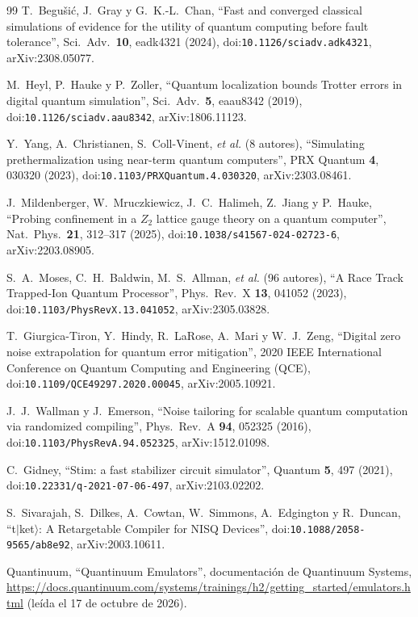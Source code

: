 \documentclass[11pt,a4paper]{article}
\begin{document}
\begin{thebibliography}{99}
 T.~Begu\v{s}i\'c, J.~Gray y G.~K.-L.~Chan, ``Fast and converged classical simulations of evidence for the utility of quantum computing before fault tolerance'', Sci.\ Adv.\ \textbf{10}, eadk4321 (2024), doi:\nolinkurl{10.1126/sciadv.adk4321}, arXiv:2308.05077.

 M.~Heyl, P.~Hauke y P.~Zoller, ``Quantum localization bounds Trotter errors in digital quantum simulation'', Sci.\ Adv.\ \textbf{5}, eaau8342 (2019), doi:\nolinkurl{10.1126/sciadv.aau8342}, arXiv:1806.11123.

 Y.~Yang, A.~Christianen, S.~Coll-Vinent, \emph{et al.} (8 autores), ``Simulating prethermalization using near-term quantum computers'', PRX Quantum \textbf{4}, 030320 (2023), doi:\nolinkurl{10.1103/PRXQuantum.4.030320}, arXiv:2303.08461.

 J.~Mildenberger, W.~Mruczkiewicz, J.~C.~Halimeh, Z.~Jiang y P.~Hauke, ``Probing confinement in a $Z_2$ lattice gauge theory on a quantum computer'', Nat.\ Phys.\ \textbf{21}, 312--317 (2025), doi:\nolinkurl{10.1038/s41567-024-02723-6}, arXiv:2203.08905.

 S.~A.~Moses, C.~H.~Baldwin, M.~S.~Allman, \emph{et al.} (96 autores), ``A Race Track Trapped-Ion Quantum Processor'', Phys.\ Rev.\ X \textbf{13}, 041052 (2023), doi:\nolinkurl{10.1103/PhysRevX.13.041052}, arXiv:2305.03828.

 T.~Giurgica-Tiron, Y.~Hindy, R.~LaRose, A.~Mari y W.~J.~Zeng, ``Digital zero noise extrapolation for quantum error mitigation'', 2020 IEEE International Conference on Quantum Computing and Engineering (QCE), doi:\nolinkurl{10.1109/QCE49297.2020.00045}, arXiv:2005.10921.

 J.~J.~Wallman y J.~Emerson, ``Noise tailoring for scalable quantum computation via randomized compiling'', Phys.\ Rev.\ A \textbf{94}, 052325 (2016), doi:\nolinkurl{10.1103/PhysRevA.94.052325}, arXiv:1512.01098.

 C.~Gidney, ``Stim: a fast stabilizer circuit simulator'', Quantum \textbf{5}, 497 (2021), doi:\nolinkurl{10.22331/q-2021-07-06-497}, arXiv:2103.02202.

 S.~Sivarajah, S.~Dilkes, A.~Cowtan, W.~Simmons, A.~Edgington y R.~Duncan, ``t$|$ket$\rangle$: A Retargetable Compiler for NISQ Devices'', doi:\nolinkurl{10.1088/2058-9565/ab8e92}, arXiv:2003.10611.

 Quantinuum, ``Quantinuum Emulators'', documentaci\'on de Quantinuum Systems, \url{https://docs.quantinuum.com/systems/trainings/h2/getting_started/emulators.html} (le\'ida el 17 de octubre de 2026).


\end{thebibliography}
\end{document}
